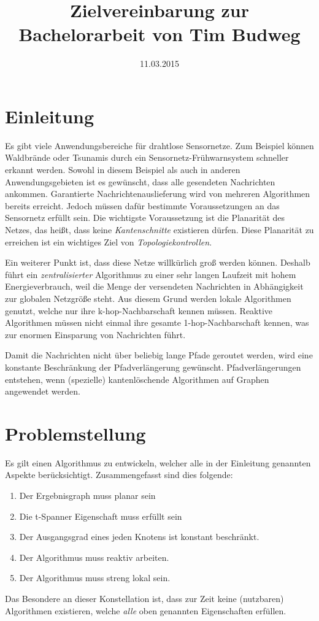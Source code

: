 \documentclass[a4paper,DIV10,12pt,headsepline,smallheadings]{scrreprt}
\title{Zielvereinbarung zur Bachelorarbeit von Tim Budweg}
\author{}
\date{11.03.2015}
\begin{document}
\maketitle

\section{Einleitung}
Es gibt viele Anwendungsbereiche für drahtlose Sensornetze. 
Zum Beispiel können Waldbrände oder Tsunamis durch ein Sensornetz-Frühwarnsystem schneller erkannt werden. 
Sowohl in diesem Beispiel als auch in anderen Anwendungsgebieten ist es gewünscht, dass alle gesendeten Nachrichten ankommen.
Garantierte Nachrichtenauslieferung wird von mehreren Algorithmen bereits erreicht.
Jedoch müssen dafür bestimmte Voraussetzungen an das Sensornetz erfüllt sein. 
Die wichtigste Voraussetzung ist die Planarität des Netzes, das heißt, dass keine \emph{Kantenschnitte} existieren dürfen. 
Diese Planarität zu erreichen ist ein wichtiges Ziel von \emph{Topologiekontrollen}.

Ein weiterer Punkt ist, dass diese Netze willkürlich groß werden können.
Deshalb führt ein \emph{zentralisierter} Algorithmus zu einer sehr langen Laufzeit mit hohem Energieverbrauch, weil die Menge der versendeten Nachrichten in Abhängigkeit zur globalen Netzgröße steht.
Aus diesem Grund werden lokale Algorithmen genutzt, welche nur ihre k-hop-Nachbarschaft kennen müssen.
Reaktive Algorithmen müssen nicht einmal ihre gesamte 1-hop-Nachbarschaft kennen, was zur enormen Einsparung von Nachrichten führt.

Damit die Nachrichten nicht über beliebig lange Pfade geroutet werden, wird eine konstante Beschränkung der Pfadverlängerung gewünscht. 
Pfadverlängerungen entstehen, wenn (spezielle) kantenlöschende Algorithmen auf Graphen angewendet werden.

\section{Problemstellung}
Es gilt einen Algorithmus zu entwickeln, welcher alle in der Einleitung genannten Aspekte berücksichtigt.
Zusammengefasst sind dies folgende:
\begin{enumerate}
\item Der Ergebnisgraph muss planar sein
\item Die t-Spanner Eigenschaft muss erfüllt sein
\item Der Ausgangsgrad eines jeden Knotens ist konstant beschränkt.
\item Der Algorithmus muss reaktiv arbeiten.
\item Der Algorithmus muss streng lokal sein.
\end{enumerate}
Das Besondere an dieser Konstellation ist, dass zur Zeit keine (nutzbaren) Algorithmen existieren, welche \emph{alle} oben genannten Eigenschaften erfüllen.
\end{document}
